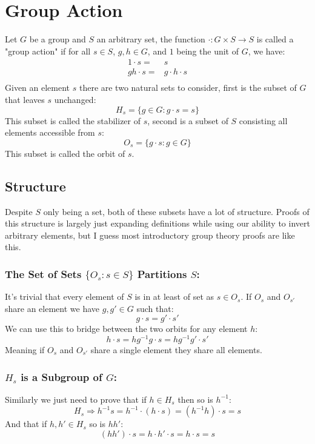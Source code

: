 
\section{Group Action}
Let $G$ be a group and $S$ an arbitrary set,
the function $\cdot:G\times S\rightarrow S$ is called a "group action" if for all $s\in S$, $g,h\in G$, and $1$ being the unit of $G$, we have:
\[\begin{aligned}
	1\cdot s =& s\\
	gh\cdot s =& g\cdot h\cdot s\\
\end{aligned}\]
Given an element $s$ there are two natural sets to consider,
first is the subset of $G$ that leaves $s$ unchanged:
\[H_s=\{g\in G:g\cdot s = s\}\]
This subset is called the stabilizer of $s$,
second is a subset of $S$ consisting all elements accessible from $s$:
\[O_s =\{g\cdot s:g\in G\}\]
This subset is called the orbit of $s$.

\subsection{Structure}
Despite $S$ only being a set,
both of these subsets have a lot of structure.
Proofs of this structure is largely just expanding definitions while using our ability to invert arbitrary elements,
but I guess most introductory group theory proofs are like this.

\subsubsection{The Set of Sets $\{O_s:s\in S\}$ Partitions $S$:}
It's trivial that every element of $S$ is in at least of set as $s\in O_s$.
If $O_s$ and $O_{s'}$ share an element we have $g,g'\in G$ such that:
\[g\cdot s = g'\cdot s'\]
We can use this to bridge between the two orbits for any element $h$:
\[h\cdot s = hg^{-1}g\cdot s = hg^{-1}g'\cdot s'\]
Meaning if $O_s$ and $O_{s'}$ share a single element they share all elements.


\subsubsection{$H_s$ is a Subgroup of $G$:}
Similarly we just need to prove that if $h\in H_s$ then so is $h^{-1}$:
\[H_s\Rightarrow  h^{-1}s = h^{-1}\cdot (h\cdot s) = (h^{-1}h)\cdot s=s\]
And that if $h,h'\in H_s$ so is $hh'$:
\[(hh')\cdot s = h\cdot h'\cdot s = h\cdot s = s\]

